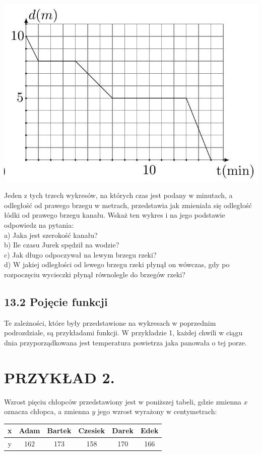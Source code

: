 \documentclass[10pt]{article}
\begin{document}
\includegraphics[max width=\textwidth, center]{2024_11_21_e9b4faa005d5be2cc318g-120(2)}

Jeden z tych trzech wykresów, na których czas jest podany w minutach, a odległość od prawego brzegu w metrach, przedstawia jak zmieniała się odległość łódki od prawego brzegu kanału. Wskaż ten wykres i na jego podstawie odpowiedz na pytania:\\
a) Jaka jest szerokość kanału?\\
b) Ile czasu Jurek spędził na wodzie?\\
c) Jak długo odpoczywał na lewym brzegu rzeki?\\
d) W jakiej odległości od lewego brzegu rzeki płynął on wówczas, gdy po rozpoczęciu wycieczki płynął równolegle do brzegów rzeki?

\subsection*{13.2 Pojęcie funkcji}
Te zależności, które były przedstawione na wykresach w poprzednim podrozdziale, są przykładami funkcji. W przykładzie 1, każdej chwili w ciągu dnia przyporządkowana jest temperatura powietrza jaka panowała o tej porze.

\section*{PRZYKŁAD 2.}
Wzrost pięciu chłopców przedstawiony jest w poniższej tabeli, gdzie zmienna \(x\) oznacza chłopca, a zmienna \(y\) jego wzrost wyrażony w centymetrach:

\begin{center}
\begin{tabular}{|c|c|c|c|c|c|}
\hline
x & Adam & Bartek & Czesiek & Darek & Edek \\
\hline
y & 162 & 173 & 158 & 170 & 166 \\
\hline
\end{tabular}
\end{center}
\end{document}
